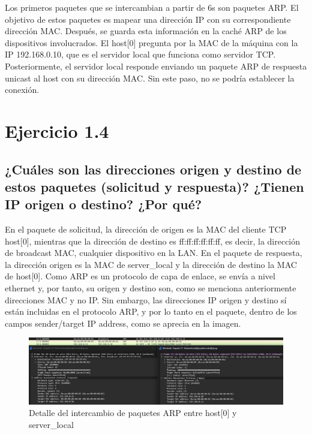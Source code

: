 Los primeros paquetes que se intercambian a partir de 6s son paquetes ARP. El objetivo de estos paquetes es mapear una dirección IP con su correspondiente dirección MAC. Después, se guarda esta información en la caché ARP de los dispositivos involucrados. El host[0] pregunta por la MAC de la máquina con la IP 192.168.0.10, que es el servidor local que funciona como servidor TCP. Posteriormente, el servidor local responde enviando un paquete ARP de respuesta unicast al host con su dirección MAC. Sin este paso, no se podría establecer la conexión.

\section{Ejercicio 1.4}

\subsection{¿Cuáles son las direcciones origen y destino de estos paquetes (solicitud y respuesta)? ¿Tienen IP origen o destino? ¿Por qué?}

En el paquete de solicitud, la dirección de origen es la MAC del cliente TCP host[0], mientras que la dirección de destino es ff:ff:ff:ff:ff:ff, es decir, la dirección de broadcast MAC, cualquier dispositivo en la LAN. En el paquete de respuesta, la dirección origen es la MAC de server\_local y la dirección de destino la MAC de host[0]. 
Como ARP es un protocolo de capa de enlace, se envía a nivel ethernet y, por tanto, su origen y destino son, como se menciona anteriormente direcciones MAC y no IP. Sin embargo, las direcciones IP origen y destino sí están incluidas en el protocolo ARP, y por lo tanto en el paquete, dentro de los campos sender/target IP address, como se aprecia en la imagen.

\begin{figure}[H]
    \centering
    \includegraphics[width=135mm, scale=0.75]{imaxes/ejercicio1_4.png}
    \caption{Detalle del intercambio de paquetes ARP entre host[0] y server\_local}
    \label{fig:ARP_host0}
\end{figure}

